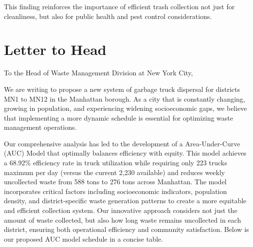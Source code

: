 \documentclass{article}
\begin{document}
This finding reinforces the importance of efficient trash collection not just for cleanliness, but also for public health and pest control considerations.
\newpage
\section{Letter to Head}

To the Head of Waste Management Division at New York City,

We are writing to propose a new system of garbage truck dispersal for districts MN1 to MN12 in the Manhattan borough. As a city that is constantly changing, growing in population, and experiencing widening socioeconomic gaps, we believe that implementing a more dynamic schedule is essential for optimizing waste management operations.

Our comprehensive analysis has led to the development of a Area-Under-Curve (AUC) Model that optimally balances efficiency with equity. This model achieves a 68.92\% efficiency rate in truck utilization while requiring only 223 trucks maximum per day (versus the current 2,230 available) and reduces weekly uncollected waste from 588 tons to 276 tons across Manhattan. The model incorporates critical factors including socioeconomic indicators, population density, and district-specific waste generation patterns to create a more equitable and efficient collection system. Our innovative approach considers not just the amount of waste collected, but also how long waste remains uncollected in each district, ensuring both operational efficiency and community satisfaction. Below is our proposed AUC model schedule in a concise table.
\end{document}
